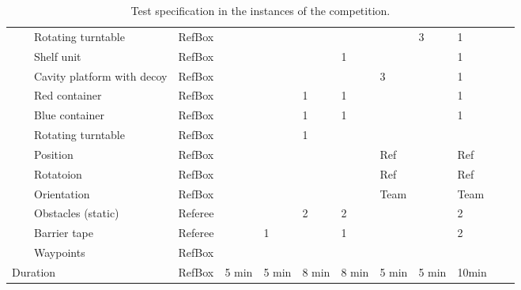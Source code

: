 \begin{landscape}
\begin{table}[h!]
\begin{tabular}{|l|l|l|l*{9}{|P{1cm}}|}
      &  & Rotating turntable& RefBox  &       &       &       &       &        & 3  & 1   \\ 
      \hhline{~-----------} 
      & 
         & Shelf unit          & RefBox &       &       &      &   1     &        &   & 1   \\ \hhline{~~----------}
      &  & Cavity platform with decoy& RefBox &       &       &       &       &  3   &   & 1   \\ \hhline{~~----------}
      &  & Red container       & RefBox &       &       &   1   &   1   &       &   & 1   \\ \hhline{~~----------}
      &  & Blue container      & RefBox &       &       &   1   &   1   &       &   & 1   \\ \hhline{~~----------}
      &  & Rotating turntable  & RefBox &       &       &   1   &      &       &   &    \\ 
      \hhline{------------} \hhline{------------}
      & 
         & Position     & RefBox &       &       &      &      &   Ref	  &   &  Ref   \\ \hhline{~~----------}
      &  & Rotatoion	& RefBox &       &       &      &      &   Ref    &   &  Ref   \\ \hhline{~~----------}
      &  & Orientation	& RefBox &       &       &      &      &   Team   &   &  Team  \\ 
    \hhline{~-----------} \hhline{~-----------}
     & 
     &     Obstacles (static) & Referee &       &       &   2   &   2   &       &   & 2   \\ \hhline{~~----------}
     &   & Barrier tape       & Referee &       &   1   &       &    1    &       &   & 2   \\ \hhline{~~----------}
     &   & Waypoints          & RefBox  &       &       &       &       &       &   &    \\ 
		\hline \hline
		 \multicolumn{3}{|l|}{Duration} 
		                    & RefBox & 5 min & 5 min  &   8 min &   8 min & 5 min & 5 min & 10min \\
		\hline
 \end{tabular}
 \caption{Test specification in the instances of the \RCAW \YEAR competition.}
 \label{tab:Instances}
\end{table}
\end{landscape}

